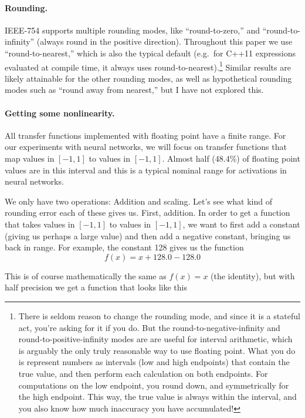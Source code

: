 \documentclass[twocolumn]{article}
\begin{document}
\paragraph{Rounding.}
IEEE-754 supports multiple rounding modes, like ``round-to-zero,'' and
``round-to-infinity'' (always round in the positive direction).
Throughout this paper we use ``round-to-nearest,'' which is also the
typical default (e.g.~for C++11 expressions evaluated at compile time,
it always uses round-to-nearest).\footnote{There is seldom reason to
  change the rounding mode, and since it is a stateful act, you're
  asking for it if you do. But the round-to-negative-infinity and
  round-to-positive-infinity modes are are useful for interval
  arithmetic, which is arguably the only truly reasonable way to use
  floating point. What you do is represent numbers as intervals (low
  and high endpoints) that contain the true value, and then perform
  each calculation on both endpoints. For computations on the low
  endpoint, you round down, and symmetrically for the high endpoint.
  This way, the true value is always within the interval, and you also
  know how much inaccuracy you have accumulated!} Similar results are
likely attainable for the other rounding modes, as well as
hypothetical rounding modes such as ``round away from nearest,'' but I
have not explored this.

\paragraph{Getting some nonlinearity.} \label{sec:plus128}
All transfer functions implemented with floating point have a finite
range. For our experiments with neural networks, we will focus on
transfer functions that map values in $[-1, 1]$ to values in $[-1, 1]$.
Almost half (48.4\%) of floating point values are in this interval and this
is a typical nominal range for activations in neural networks.

We only have two operations: Addition and scaling. Let's see what kind
of rounding error each of these gives us. First, addition. In order to
get a function that takes values in $[-1, 1]$ to values in $[-1, 1]$, we
want to first add a constant (giving us perhaps a large value) and
then add a negative constant, bringing us back in range. For example,
the constant 128 gives us the function
%
$$f(x) = x + 128.0 - 128.0$$

This is of course mathematically the same as $f(x) = x$ (the
identity), but with half precision we get a function that looks like
this
\end{document}
